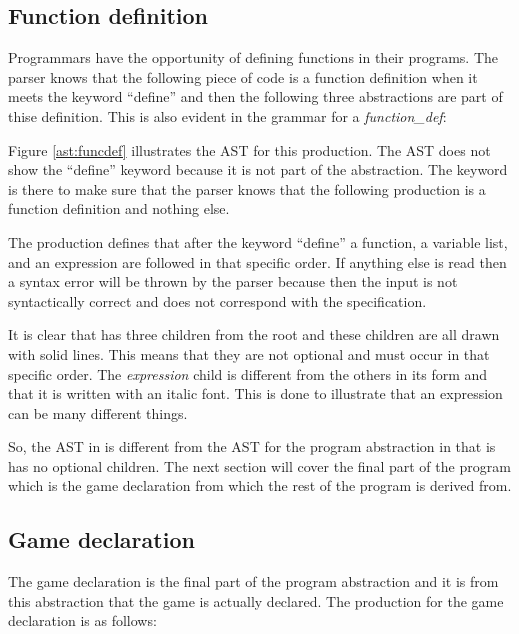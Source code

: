 \subsection{Function definition}
Programmars have the opportunity of defining functions in their programs. The parser knows that the following piece of code is a function definition when it meets the keyword ``define'' and then the following three abstractions are part of thise definition. This is also evident in the grammar for a \textit{function\_def}:

\begin{ebnf}
\end{ebnf}



Figure \ref{ast:funcdef} illustrates the AST for this production. The AST does not show the ``define'' keyword because it is not part of the abstraction. The keyword is there to make sure that the parser knows that the following production is a function definition and nothing else.

The production defines that after the keyword ``define'' a function, a variable list, and an expression are followed in that specific order. If anything else is read then a syntax error will be thrown by the parser because then the input is not syntactically correct and does not correspond with the specification.

It is clear that  has three children from the root and these children are all drawn with solid lines. This means that they are not optional and must occur in that specific order. The \textit{expression} child is different from the others in its form and that it is written with an italic font. This is done to illustrate that an expression can be many different things.

So, the AST in  is different from the AST for the program abstraction in that is has no optional children. The next section will cover the final part of the program which is the game declaration from which the rest of the program is derived from.

\subsection{Game declaration}
The game declaration is the final part of the program abstraction and it is from this abstraction that the game is actually declared. The production for the game declaration is as follows:

